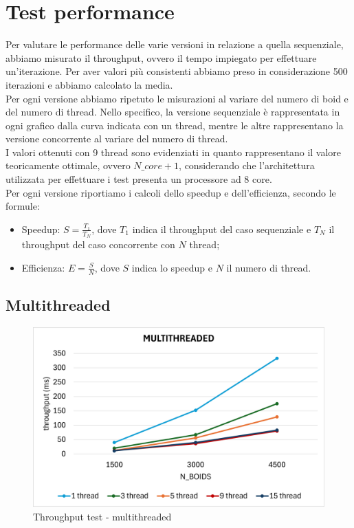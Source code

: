 \documentclass[a4paper,12pt]{report}
\begin{document}
\chapter{Test performance}
Per valutare le performance delle varie versioni in relazione a quella sequenziale, abbiamo misurato il throughput, ovvero il tempo impiegato per effettuare un'iterazione. Per aver valori più consistenti abbiamo preso in considerazione 500 iterazioni e abbiamo calcolato la media.\\
Per ogni versione abbiamo ripetuto le misurazioni al variare del numero di boid e del numero di thread.
Nello specifico, la versione sequenziale è rappresentata in ogni grafico dalla curva indicata con un thread, mentre le altre rappresentano la versione concorrente al variare del numero di thread.\\
I valori ottenuti con 9 thread sono evidenziati in quanto rappresentano il valore teoricamente ottimale, ovvero $N\_core + 1$, considerando che l'architettura utilizzata per effettuare i test presenta un processore ad 8 core.\\
Per ogni versione riportiamo i calcoli dello speedup e dell'efficienza, secondo le formule:
\begin{itemize}
    \item Speedup: $S = \frac{T_1}{T_N}$, dove $T_1$ indica il throughput del caso sequenziale e $T_N$ il throughput del caso concorrente con $N$ thread;
    \item Efficienza: $E = \frac{S}{N}$, dove $S$ indica lo speedup e $N$ il numero di thread.
\end{itemize}

\section{Multithreaded}
\begin{figure}[H]
    \centering
    \includegraphics[width=\linewidth]{figures/multithreaded_test.png}
    \caption{\centering Throughput test - multithreaded}
    \label{fig:throughput-test-multithreaded}
\end{figure}
\end{document}
